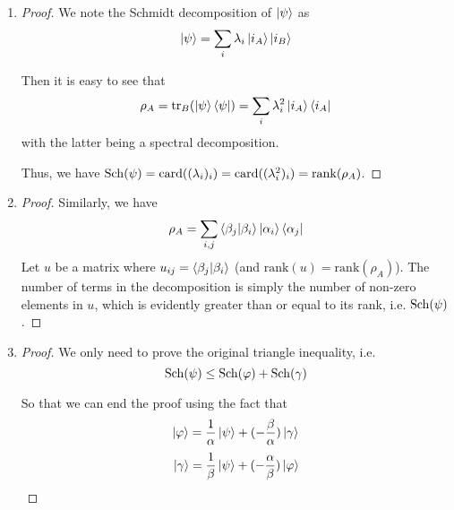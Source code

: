 \documentclass[../main.tex]{subfiles}
\begin{document}
\bigskip
\begin{problem}
\end{problem}
\begin{enumerate}
    \item
    \begin{proof}
    We note the Schmidt decomposition of $\ket{\psi}$ as
    \begin{equation*}
        \ket{\psi}=\sum_i\lambda_i\ket{i_A}\ket{i_B}
    \end{equation*}
    
    Then it is easy to see that
    \begin{equation*}
        \rho_A=\mathrm{tr}_B(\ket{\psi}\bra{\psi})=\sum_i\lambda_i^2\ket{i_A}\bra{i_A}
    \end{equation*}
    with the latter being a spectral decomposition.
    
    Thus, we have $\mathrm{Sch}(\psi)=\mathrm{card}((\lambda_i)_i)=\mathrm{card}((\lambda_i^2)_i)=\mathrm{rank}(\rho_A)$.
    \end{proof}
    
    \item
    \begin{proof}
    Similarly, we have
    \begin{equation*}
        \rho_A=\sum_{i,j}\braket{\beta_j\lvert\beta_i}\ket{\alpha_i}\bra{\alpha_j}
    \end{equation*}
    Let $u$ be a matrix where $u_{i j}=\braket{\beta_j\lvert\beta_i}$ (and $\mathrm{rank}(u)=\mathrm{rank}(\rho_A)$). The number of terms in the decomposition is simply the number of non-zero elements in $u$, which is evidently greater than or equal to its rank, i.e. $\mathrm{Sch}(\psi)$.
    \end{proof}
    
    \item
    \begin{proof}
    We only need to prove the original triangle inequality, i.e.
    \begin{equation*}
        \mathrm{Sch}(\psi)\leq\mathrm{Sch}(\varphi)+\mathrm{Sch}(\gamma)
    \end{equation*}
    
    So that we can end the proof using the fact that
    \begin{equation*}
        \ket{\varphi}=\frac{1}{\alpha}\ket{\psi}+(-\frac{\beta}{\alpha})\ket{\gamma}
    \end{equation*}
    \begin{equation*}
        \ket{\gamma}=\frac{1}{\beta}\ket{\psi}+(-\frac{\alpha}{\beta})\ket{\varphi}
    \end{equation*}
    

\end{proof}
\end{enumerate}
\end{document}
